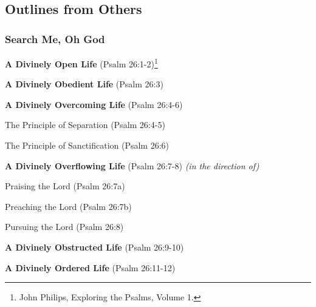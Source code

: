 \subsection{Outlines from Others}

\subsubsection{Search Me, Oh God}
\begin{compactenum}[I.]
    \item \textbf{A Divinely Open Life} (Psalm 26:1-2)\footnote{John Philips, Exploring the Psalms, Volume 1.\cite{Phillips2001ExploringPsalms1}}
    \item \textbf{A Divinely Obedient Life} (Psalm 26:3)
    \item \textbf{A Divinely Overcoming Life} (Psalm 26:4-6) 
    \begin{compactenum}[A.]
        \item The Principle of Separation (Psalm 26:4-5)
        \item The Principle of Sanctification (Psalm 26:6)
    \end{compactenum}
    \item \textbf{A Divinely Overflowing Life} (Psalm 26:7-8) \emph{(in the direction of)}
    \begin{compactenum}[A.]
        \item Praising the Lord (Psalm 26:7a)
        \item Preaching the Lord (Psalm 26:7b)
        \item Pursuing the Lord (Psalm 26:8)
    \end{compactenum}
    \item \textbf{A Divinely Obstructed Life} (Psalm 26:9-10)
    \item \textbf{A Divinely Ordered Life} (Psalm 26:11-12)
\end{compactenum}



